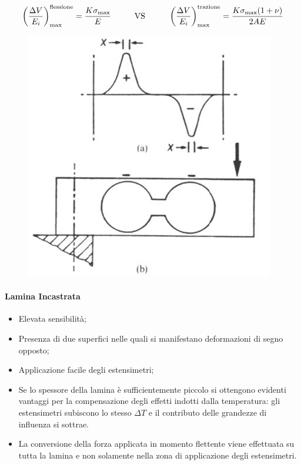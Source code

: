 \documentclass[a4paper, 15pt]{article}
\newcommand{\cmark}{\ding{51}}
\newcommand{\xmark}{\ding{55}}
\begin{document}
\begin{adjustwidth}{2in}{}
 		\[\left(\Delta V\over E_i \right)^{\text{flessione}}_{\text{max}}={K\sigma_{\text{max}}\over E}\hspace{1cm}\text{VS}\hspace{1cm}\left(\Delta V\over E_i \right)^{\text{trazione}}_{\text{max}}= {K\sigma_{\text{max}}(1+\nu)\over2 AE}\] 	
 		\begin{figure}[H]
 			\centering
 			\includegraphics[width=0.5\linewidth]{immagini/14}
 			\label{fig:14}
 		\end{figure} 
\newpage			
 \paragraph{Lamina Incastrata}
 		\begin{itemize}[label=\textcolor{green}{\cmark}]
 			\item Elevata sensibilità;
 			
 			\item Presenza di due superfici nelle quali si manifestano deformazioni di segno
 			opposto;
 			
 			\item Applicazione facile degli estensimetri;
 			
 			\item Se lo spessore della lamina è sufficientemente piccolo si ottengono evidenti
 			vantaggi per la compensazione degli effetti indotti dalla temperatura: gli estensimetri subiscono lo stesso $\Delta T$ e il contributo delle grandezze di influenza si sottrae.
 		\end{itemize}
 		
 		\begin{itemize}[label=\textcolor{red}{\xmark}]
 			\item La conversione della forza applicata in momento flettente viene effettuata su
 			tutta la lamina e non solamente nella zona di applicazione degli estensimetri.
 			

\end{itemize}
\end{adjustwidth}
\end{document}
